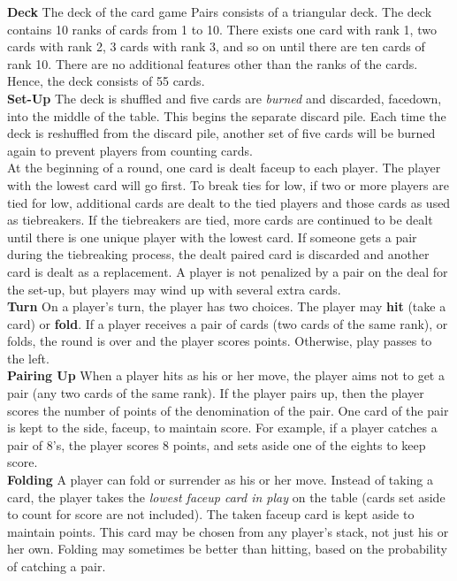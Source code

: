 \documentclass{article}
\theoremstyle{definition}
\newcounter{a}
\begin{document}
\textbf{Deck} \indent
The deck of the card game Pairs consists of a triangular deck.  The deck contains 10 ranks of cards from 1 to 10.  There exists one card with rank 1, two cards with rank 2, 3 cards with rank 3, and so on until there are ten cards of rank 10.  There are no additional features other than the ranks of the cards.  Hence, the deck consists of 55 cards. \\
\textbf{Set-Up} \indent
The deck is shuffled and five cards are \emph{burned} and discarded, facedown, into the middle of the table.  This begins the separate discard pile.  Each time the deck is reshuffled from the discard pile, another set of five cards will be burned again to prevent players from counting cards. \\
At the beginning of a round, one card is dealt faceup to each player.  The player with the lowest card will go first.  To break ties for low, if two or more players are tied for low, additional cards are dealt to the tied players and those cards as used as tiebreakers.  If the tiebreakers are tied, more cards are continued to be dealt until there is one unique player with the lowest card.  If someone gets  a pair during the tiebreaking process, the dealt paired card is discarded and another card is dealt as a replacement.  A player is not penalized by a pair on the deal for the set-up, but players may wind up with several extra cards. \\
\textbf{Turn} \indent
On a player's turn, the player has two choices.  The player may \textbf{hit} (take a card) or \textbf{fold}.  If a player receives a pair of cards (two cards of the same rank), or folds, the round is over and the player scores points.  Otherwise, play passes to the left. \\
\textbf{Pairing Up} \indent
When a player hits as his or her move, the player aims not to get a pair (any two cards of the same rank).  If the player pairs up, then the player scores the number of points of the denomination of the pair.  One card of the pair is kept to the side, faceup, to maintain score.  For example, if a player catches a pair of 8's, the player scores 8 points, and sets aside one of the eights to keep score. \\
\textbf{Folding} \indent
A player can fold or surrender as his or her move.  Instead of taking a card, the player takes the \emph{lowest faceup card in play} on the table (cards set aside to count for score are not included).  The taken faceup card is kept aside to maintain points.  This card may be chosen from any player's stack, not just his or her own.  Folding may sometimes be better than hitting, based on the probability of catching a pair. \\
\end{document}
